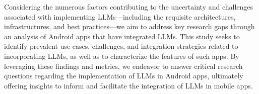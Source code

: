 

Considering the numerous factors contributing to the uncertainty and challenges associated with implementing LLMs—including the requisite architectures, infrastructures, and best practices—we aim to address key research gaps through an analysis of Android apps that have integrated LLMs. This study seeks to identify prevalent use cases, challenges, and integration strategies related to incorporating LLMs, as well as to characterize the features of such apps. By leveraging these findings and metrics, we endeavor to answer critical research questions regarding the implementation of LLMs in Android apps, ultimately offering insights to inform and facilitate the integration of LLMs in mobile apps.